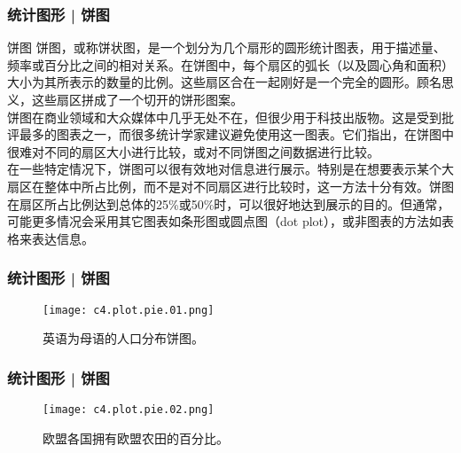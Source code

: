 \begin{frame}
  \frametitle{统计图形 | 饼图}
  \begin{block}{饼图}
饼图，或称饼状图，是一个划分为几个扇形的圆形统计图表，用于描述量、频率或百分比之间的相对关系。在饼图中，每个扇区的弧长（以及圆心角和面积）大小为其所表示的数量的比例。这些扇区合在一起刚好是一个完全的圆形。顾名思义，这些扇区拼成了一个切开的饼形图案。\\
\vspace{1em}
饼图在商业领域和大众媒体中几乎无处不在，但很少用于科技出版物。这是受到批评最多的图表之一，而\alert{很多统计学家建议避免使用这一图表}。它们指出，在饼图中很难对不同的扇区大小进行比较，或对不同饼图之间数据进行比较。\\
\vspace{0.5em}
在一些特定情况下，饼图可以很有效地对信息进行展示。特别是在想要表示某个大扇区在整体中所占比例，而不是对不同扇区进行比较时，这一方法十分有效。饼图在扇区所占比例达到总体的25\%或50\%时，可以很好地达到展示的目的。但通常，可能更多情况会采用其它图表如条形图或圆点图（dot plot），或非图表的方法如表格来表达信息。
  \end{block}
\end{frame}

\begin{frame}
  \frametitle{统计图形 | 饼图}
  \begin{figure}
    \centering
    \texttt{[image: c4.plot.pie.01.png]}
    \caption{英语为母语的人口分布饼图。}
  \end{figure}
\end{frame}

\begin{frame}
  \frametitle{统计图形 | 饼图}
  \begin{figure}
    \centering
    \texttt{[image: c4.plot.pie.02.png]}
    \caption{欧盟各国拥有欧盟农田的百分比。}
  \end{figure}
\end{frame}

